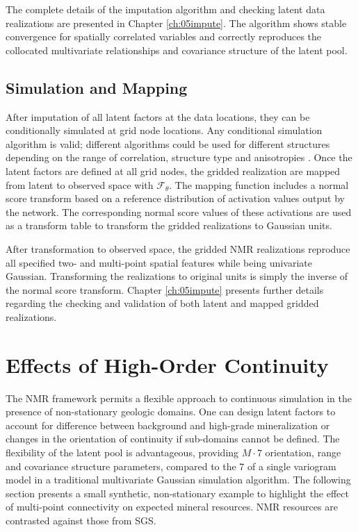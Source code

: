 The complete details of the imputation algorithm and checking latent data realizations are presented in Chapter \ref{ch:05impute}. The algorithm shows stable convergence for spatially correlated variables and correctly reproduces the collocated multivariate relationships and covariance structure of the latent pool.

\FloatBarrier
\subsection{Simulation and Mapping}
\label{subsec:03simulate}

After imputation of all latent factors at the data locations, they can be conditionally simulated at grid node locations. Any conditional simulation algorithm is valid; different algorithms could be used for different structures depending on the range of correlation, structure type and anisotropies \citep{pinto2020independent}. Once the latent factors are defined at all grid nodes, the gridded realization are mapped from latent to observed space with $\mathcal{F}_{\theta}$. The mapping function includes a normal score transform based on a reference distribution of activation values output by the network. The corresponding normal score values of these activations are used as a transform table to transform the gridded realizations to Gaussian units.

After transformation to observed space, the gridded \gls{NMR} realizations reproduce all specified two- and multi-point spatial features while being univariate Gaussian. Transforming the realizations to original units is simply the inverse of the normal score transform. Chapter \ref{ch:05impute} presents further details regarding the checking and validation of both latent and mapped gridded realizations.


\FloatBarrier
\section{Effects of High-Order Continuity}
\label{sec:03effect}

The \gls{NMR} framework permits a flexible approach to continuous simulation in the presence of non-stationary geologic domains. One can design latent factors to account for difference between background and high-grade mineralization or changes in the orientation of continuity if sub-domains cannot be defined. The flexibility of the latent pool is advantageous, providing $M \cdot 7$ orientation, range and covariance structure parameters, compared to the 7 of a single variogram model in a traditional multivariate Gaussian simulation algorithm. The following section presents a small synthetic, non-stationary example to highlight the effect of multi-point connectivity on expected mineral resources. \Gls{NMR} resources are contrasted against those from \gls{SGS}.

